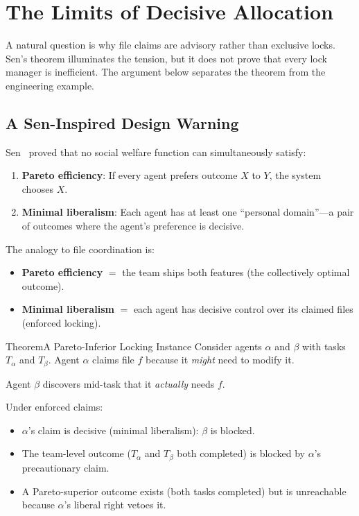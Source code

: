 \documentclass[11pt,a4paper]{article}
\theoremstyle{definition}
\theoremstyle{remark}
\begin{document}
\section{The Limits of Decisive Allocation}\label{sec:sen}

A natural question is why file claims are advisory rather than exclusive locks. Sen's theorem illuminates the tension, but it does not prove that every lock manager is inefficient. The argument below separates the theorem from the engineering example.

\subsection{A Sen-Inspired Design Warning}

Sen~ proved that no social welfare function can simultaneously satisfy:
\begin{enumerate}[nosep]
  \item \textbf{Pareto efficiency}: If every agent prefers outcome $X$ to $Y$, the system chooses $X$.
  \item \textbf{Minimal liberalism}: Each agent has at least one ``personal domain''---a pair of outcomes where the agent's preference is decisive.
\end{enumerate}

The analogy to file coordination is:

\begin{itemize}[nosep]
  \item \textbf{Pareto efficiency} $=$ the team ships both features (the collectively optimal outcome).
  \item \textbf{Minimal liberalism} $=$ each agent has decisive control over its claimed files (enforced locking).
\end{itemize}

\begin{pdclaim}{Theorem}{A Pareto-Inferior Locking Instance}
\setlength{\parskip}{4pt plus 1pt}
\label{prop:sen}
Consider agents $\alpha$ and $\beta$ with tasks $T_\alpha$ and $T_\beta$. Agent $\alpha$ claims file $f$ because it \emph{might} need to modify it. 

Agent $\beta$ discovers mid-task that it \emph{actually} needs $f$. 

Under enforced claims:
\begin{itemize}[nosep]
  \item $\alpha$'s claim is decisive (minimal liberalism): $\beta$ is blocked.
  \item The team-level outcome ($T_\alpha$ and $T_\beta$ both completed) is blocked by $\alpha$'s precautionary claim.
  \item A Pareto-superior outcome exists (both tasks completed) but is unreachable because $\alpha$'s liberal right vetoes it.
\end{itemize}
\end{pdclaim}
\end{document}
